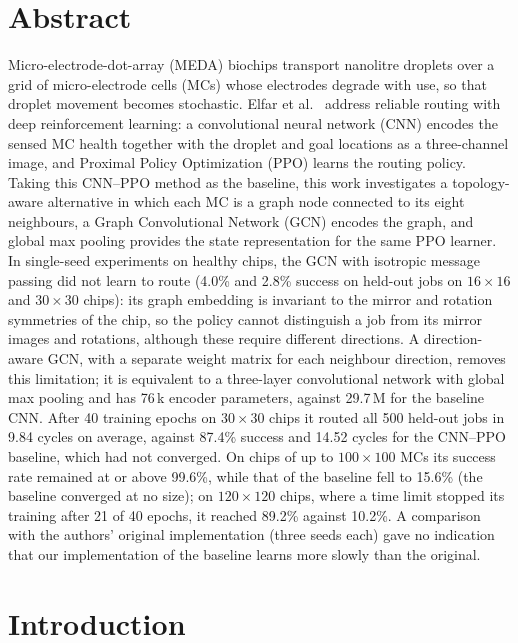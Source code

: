 \documentclass[11pt,a4paper]{article}
\begin{document}
\section*{Abstract}\label{sec:abstract}
Micro-electrode-dot-array (MEDA) biochips transport nanolitre droplets over a
grid of micro-electrode cells (MCs) whose electrodes degrade with use, so that
droplet movement becomes stochastic. Elfar et al.\ \cite{elfar2023} address
reliable routing with deep reinforcement learning: a convolutional neural
network (CNN) encodes the sensed MC health together with the droplet and goal
locations as a three-channel image, and Proximal Policy Optimization (PPO)
learns the routing policy. Taking this CNN--PPO method as the baseline, this
work investigates a topology-aware alternative in which each MC is a graph
node connected to its eight neighbours, a Graph Convolutional Network (GCN) encodes
the graph, and global max pooling provides the state
representation for the same PPO learner.
In single-seed experiments on healthy chips, the GCN with isotropic message
passing did not learn to route (4.0\% and 2.8\% success on held-out jobs on
$16\times16$ and $30\times30$ chips): its graph embedding is invariant to the
mirror and rotation symmetries of the chip, so the policy cannot distinguish a
job from its mirror images and rotations, although these require different
directions. A direction-aware GCN, with a separate
weight matrix for each neighbour direction, removes this limitation; it is
equivalent to a three-layer convolutional network with global max pooling and
has 76\,k encoder parameters, against 29.7\,M for the baseline CNN. After 40
training epochs on $30\times30$ chips it routed all 500 held-out jobs in 9.84
cycles on average, against 87.4\% success and 14.52 cycles for the CNN--PPO
baseline, which had not converged. On chips of up to $100\times100$ MCs its
success rate remained at or above 99.6\%, while that of the baseline fell to
15.6\% (the baseline converged at no size); on $120\times120$ chips, where a time limit stopped its training after
21 of 40 epochs, it reached 89.2\% against 10.2\%. A comparison with the
authors' original implementation (three seeds each) gave no indication that our
implementation of the baseline learns more slowly than the original.

\section{Introduction}\label{sec:intro}
\end{document}
